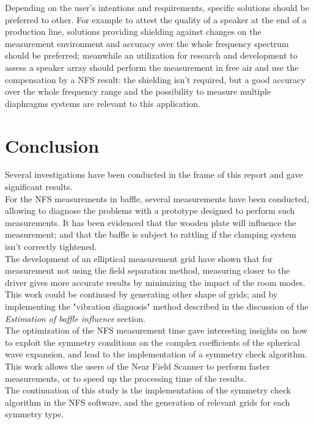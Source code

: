 \documentclass{report}
\begin{document}
\vspace{0.5cm}

Depending on the user's intentions and requirements, specific solutions should be preferred to other. For example to attest the quality of a speaker at the end of a production line, solutions providing shielding against changes on the measurement environment and accuracy over the whole frequency spectrum should be preferred; meanwhile an utilization for research and development to assess a speaker array should perform the measurement in free air and use the compensation by a NFS result: the shielding isn't required, but a good accuracy over the whole frequency range and the possibility to measure multiple diaphragms systems are relevant to this application. 


\chapter*{Conclusion}

Several investigations have been conducted in the frame of this report and gave significant results. \\

For the NFS measurements in baffle, several measurements have been conducted, allowing to diagnose the problems with a prototype designed to perform such measurements. It has been evidenced that the wooden plate will influence the measurement; and that the baffle is subject to rattling if the clamping system isn't correctly tightened.  \\
The development of an elliptical measurement grid have shown that for measurement not using the field separation method, measuring closer to the driver gives more accurate results by minimizing the impact of the room modes.\\
This work could be continued by generating other shape of grids; and by implementing the "vibration diagnosis" method described in the discussion of the \textit{Estimation of baffle influence} section. \\

The optimization of the NFS measurement time gave interesting insights on how to exploit the symmetry conditions on the complex coefficients of the spherical wave expansion, and lead to the implementation of a symmetry check algorithm. This work allows the users of the Near Field Scanner to perform faster measurements, or to speed up the processing time of the results. \\
The continuation of this study is the implementation of the symmetry check algorithm in the NFS software, and the generation of relevant grids for each symmetry type. \\
\end{document}
